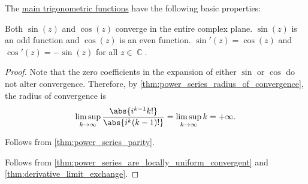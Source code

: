 \begin{proposition}\label{thm:def:trigonometric_function}
  The \hyperref[def:trigonometric_functions]{main trigonometric functions} have the following basic properties:
  \begin{thmenum}
     Both \( \sin(z) \) and \( \cos(z) \) converge in the entire complex plane.
     \( \sin(z) \) is an odd function and \( \cos(z) \) is an even function.
     \( \sin'(z) = \cos(z) \) and \( \cos'(z) = -\sin(z) \) for all \( z \in \BbbC \).
  \end{thmenum}
\end{proposition}
\begin{proof}
   Note that the zero coefficients in the expansion of either \( \sin \) or \( \cos \) do not alter convergence. Therefore, by \cref{thm:power_series_radius_of_convergence}, the radius of convergence is
  \begin{equation*}
    \limsup_{k \to \infty} \frac {\abs{i^{k-1} k!}} {\abs{i^k (k-1)!}}
    =
    \limsup_{k \to \infty} k
    =
    +\infty.
  \end{equation*}

   Follows from \cref{thm:power_series_parity}.

   Follows from \cref{thm:power_series_are_locally_uniform_convergent} and \cref{thm:derivative_limit_exchange}.
\end{proof}

